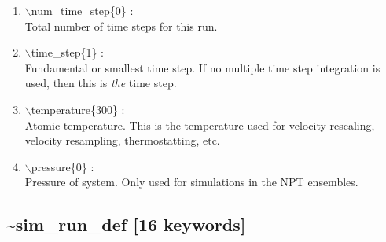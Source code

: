 \documentclass[12pt]{article}
\begin{document}
\begin{enumerate}
 \vspace{0.15in} 
 \item  $\backslash$num\_time\_step\{0\} : \\
     Total number of time steps for this run.

 \vspace{0.15in} 
 \item   $\backslash$time\_step\{1\} : \\
     Fundamental or smallest time step.  If no multiple time step integration 
     is used, then this is {\it the} time step.


 \vspace{0.15in} 
 \item   $\backslash$temperature\{300\} : \\
     Atomic temperature.  This is the temperature used for velocity rescaling,
     velocity resampling, thermostatting, etc.


 \vspace{0.15in} 
 \item   $\backslash$pressure\{0\} : \\
     Pressure of system.  Only used for simulations in the NPT ensembles.
\end{enumerate}

\newpage
\subsection*{\bf \~{}sim\_run\_def [16 keywords]}
\end{document}
